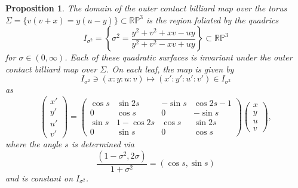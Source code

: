 \documentclass{article}
\newtheorem{prop}{Proposition}[section]
\begin{document}
\begin{prop}
\label{prop:TwistTori}
    The domain of the outer contact billiard map over the torus $\Sigma = \{  v(v+x) = y(u-y) \} \subset \mathbb{RP}^3$ is the region foliated by the quadrics
    \[I_{\sigma^2}=\left\{ \sigma^2 = \frac{y^2 + v^2 + xv-uy}{y^2 + v^2 - xv + uy} \right\}\subset \mathbb{RP}^3\]
    for $\sigma\in (0,\infty)$. Each of these quadratic surfaces is invariant under the outer contact billiard map over $\Sigma$. On each leaf, the map is given by 
    \[ I_{\sigma^2}\ni (x: y: u: v)\mapsto (x':y':u':v')\in I_{\sigma^2}\]
    as
     \[\begin{pmatrix}
        x'\\
        y'\\
        u'\\
        v'
    \end{pmatrix} = \begin{pmatrix}
        \cos s & \sin 2s & -\sin s & \cos 2s - 1\\
        0 & \cos s & 0 & -\sin s\\
        \sin s & 1 - \cos 2s & \cos s & \sin 2s\\
        0 & \sin s & 0 & \cos s
    \end{pmatrix} \begin{pmatrix}
        x \\
        y \\
        u \\
        v
    \end{pmatrix},\]
    where the angle $s$ is  determined via
    \[\dfrac{(1-\sigma^2, 2\sigma)}{1+\sigma^2} = (\cos s,\sin s)\] and is constant on $I_{\sigma^2}$.  
\end{prop}
\end{document}
